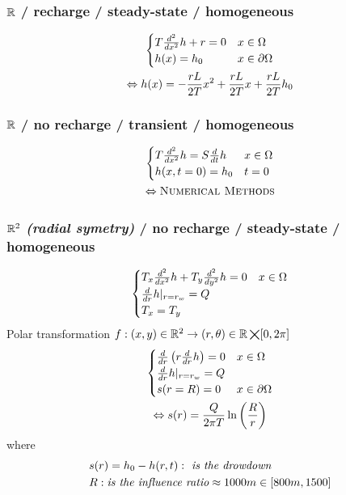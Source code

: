 \documentclass[landscape]{article}
\begin{document}
\begin{multicols*}{3}

\subsubsection{$\mathbb{R}$ / recharge / steady-state / homogeneous} %
\label{ssub:3}
\begin{multline*}
  \begin{cases}
    T \frac{d^2 }{d x^2}h + r = 0 & x \in \Omega \\
    h(x) = h_0 & x \in \partial\Omega
  \end{cases}\\
  \Leftrightarrow h(x) = - \frac{rL}{2T}x^2 + \frac{rL}{2 T}x +\frac{rL}{2T}h_0
\end{multline*}

\subsubsection{$\mathbb{R}$ / no recharge / transient / homogeneous} %
\label{ssub:3}
\begin{multline*}
  \begin{cases}
    T \frac{d^2 }{d x^2}h = S\frac{d }{d t}h & x \in \Omega \\
    h(x,t=0) = h_0 & t=0
  \end{cases}\\
  \Leftrightarrow \textsc{Numerical Methods}
\end{multline*}

\subsubsection{$\mathbb{R}^2$ \emph{(radial symetry)} / no recharge / steady-state / homogeneous} %
\label{ssub:subsubsection_name}
\begin{multline*}
  \begin{cases}
    T_x \frac{d^2 }{d x^2}h + T_y \frac{d^2 }{d y^2}h = 0 & x \in \Omega \\
    \frac{d }{d r}h |_{r=r_w} =Q &\\
    T_x = T_y & 
  \end{cases}\\
\end{multline*}
Polar transformation $f:(x,y) \in \mathbb{R}^2 \rightarrow (r,\theta) \in \mathbb{R} \bigtimes [0,2\pi]$
\begin{multline*}
  \begin{cases}
     \frac{d }{d r}\left(r\frac{d }{d r}h\right) = 0 & x \in \Omega \\
     \frac{d }{d r}h |_{r=r_w} =Q &\\
    s(r=R) = 0 & x \in \partial\Omega
  \end{cases}\\
  \Leftrightarrow s(r) = \frac{Q}{2\pi T}\ln\left(\frac{R}{r}\right)
\end{multline*}
where
$$
  \begin{aligned}
        & s(r)= h_0 - h(r,t): \emph{ is the drowdown}\\
        &R: \emph{is the influence ratio} \approx 1000m \in [800m,1500]
  \end{aligned}\notag
$$


\end{multicols*}
\end{document}
